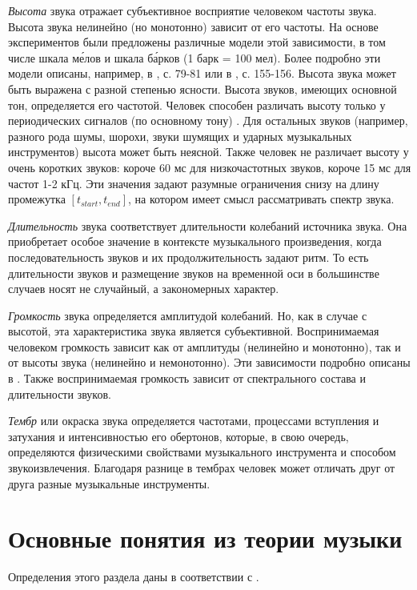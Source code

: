 \emph{Высота} звука отражает субъективное восприятие человеком частоты звука.
Высота звука нелинейно (но монотонно) зависит от его частоты. На основе
экспериментов были предложены различные модели этой зависимости, в том числе
шкала м\'{е}лов и шкала б\'{а}рков (1 барк = 100 мел). Более подробно эти модели
описаны, например, в \cite{Lerch2012}, с. 79-81 или в \cite{Aldoshina2006}, с.
155-156. Высота звука может быть выражена с разной степенью ясности. Высота
звуков, имеющих основной тон, определяется его частотой. Человек способен
различать высоту только у периодических сигналов (по основному тону)
\cite{Aldoshina2006}. Для остальных звуков (например, разного рода шумы, шорохи,
звуки шумящих и ударных музыкальных инструментов) высота может быть неясной.
Также человек не различает высоту у очень коротких звуков: короче 60 мс для
низкочастотных звуков, короче 15 мс для частот 1-2 кГц. Эти значения задают
разумные ограничения снизу на длину промежутка $[t_{start}, t_{end}]$, на
котором имеет смысл рассматривать спектр звука.

\emph{Длительность} звука соответствует длительности колебаний источника звука.
Она приобретает особое значение в контексте музыкального произведения, когда
последовательность звуков и их продолжительность задают ритм. То есть
длительности звуков и размещение звуков на временной оси в большинстве случаев
носят не случайный, а закономерных характер.

\emph{Громкость} звука определяется амплитудой колебаний. Но, как в случае с
высотой, эта характеристика звука является субъективной. Воспринимаемая
человеком громкость зависит как от амплитуды (нелинейно и монотонно), так и от
высоты звука (нелинейно и немонотонно). Эти зависимости подробно описаны в
\cite{Fastl2007}. Также воспринимаемая громкость зависит от спектрального
состава и длительности звуков.

\emph{Тембр} или окраска звука определяется частотами, процессами вступления и
затухания и интенсивностью его обертонов, которые, в свою очередь, определяются
физическими свойствами музыкального инструмента и способом звукоизвлечения.
Благодаря разнице в тембрах человек может отличать друг от друга разные
музыкальные инструменты.

\section{Основные понятия из теории музыки} \label{sectT_music}

Определения этого раздела даны в соответствии с \cite{Sposobin2012}.

